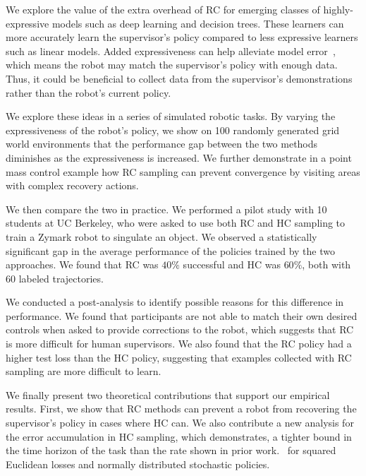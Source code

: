 \documentclass[10pt, conference]{ieeeconf}      %
\begin{document}
We explore the value of the extra overhead of RC for emerging classes of highly-expressive models such as deep learning and decision trees. These learners can more accurately learn the supervisor's policy compared to less expressive learners such as linear models. 
Added expressiveness can help alleviate model error~\cite{vapnik1992principles}, which means the robot may match the supervisor's policy with enough data. Thus, it could be beneficial to collect data from the supervisor's demonstrations rather than the robot's current policy.

We explore these ideas in a series of simulated robotic tasks. By varying the expressiveness of the robot's policy, we show on 100 randomly generated grid world environments that the performance gap between the two methods diminishes as the expressiveness is increased. We further demonstrate in a point mass control example how RC sampling can prevent convergence by visiting areas with complex recovery actions. 

We then compare the two in practice. We performed a pilot study with 10 students at UC Berkeley, who were asked to use both RC and HC sampling to train a Zymark robot to singulate an object. We observed a statistically significant gap in the average performance of the policies trained by the two approaches. We found that RC was $40\%$ successful and HC was $60\%$, both with $60$ labeled trajectories. 

We conducted a post-analysis to identify possible reasons for this difference in performance. We found that participants are not able to match their own desired controls when asked to provide corrections to the robot, which suggests that RC is more difficult for human supervisors.
We also found that the RC policy had a higher test loss than the HC policy, suggesting that examples collected with RC sampling are more difficult to learn.

We finally present two theoretical contributions that support our empirical results. First, we show that RC methods can prevent a robot from recovering the supervisor's policy in cases where HC can. We also contribute a new analysis for the error accumulation in HC sampling, which demonstrates, a tighter bound in the time horizon of the task than the rate shown in prior work.~\cite{ross2010efficient} for squared Euclidean losses and normally distributed stochastic policies.
\end{document}
